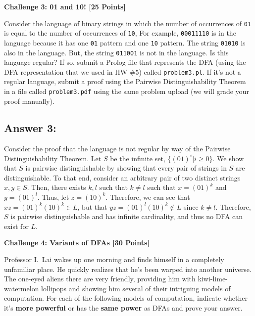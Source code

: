 \documentclass[12pt]{article}
\newcommand{\Problem}[3]{\mbox{} \newline \noindent \textbf{\textbf{Challenge #1: #2 [#3 Points] \\ }}}
\begin{document}
\Problem{3}{01 and 10!}{25}

Consider the language of binary strings in which the number of occurrences of \verb+01+ is equal to the number of occurrences of \verb+10+,  For example,
\verb+00011110+ is in the language because it has one \verb+01+ pattern and one \verb+10+ pattern.  The string \verb+01010+ is also in the language.  But, the string \verb+011001+ is not in the language.
Is this language regular?  If so, submit a Prolog file that represents the DFA (using the DFA representation that we used in HW \#5) called \verb+problem3.pl+.  If it's not a regular language, submit a proof using the Pairwise Distinguishability Theorem in a file called \verb+problem3.pdf+ using the same problem upload (we will grade your proof manually).
 
\subsection*{Answer 3:}
Consider the proof that the language is not regular by way of the Pairwise Distinguishability Theorem. Let $S$ be the infinite set, $\{(01)^i| i \geq 0\}$. We show that $S$ is pairwise distinguishable by showing that
every pair of strings in $S$ are distinguishable. To that end, consider an arbitrary pair
of two distinct strings $x, y \in S$. Then, there exists $k,l$ such that $k \neq l$ such that $x = (01)^k$ and $y = (01)^l$. Thus, let $z = (10)^k$. Therefore, we can see that $xz = (01)^k(10)^k \in L$, but that $yz = (01)^l(10)^k \not \in L$ since $k \neq l$. Therefore, $S$ is pairwise distinguishable and has infinite cardinality, and thus no DFA
can exist for $L$. 

\Problem{4}{Variants of DFAs}{30}

Professor I.~Lai wakes up one morning and finds himself in a completely unfamiliar place.  He quickly realizes that he's been warped into another universe.  The one-eyed aliens there are very friendly, providing him with kiwi-lime-watermelon lollipops and showing him several of their intriguing models of computation.  For each of the following models of computation, indicate whether it's \textbf{more powerful} or has the \textbf{same power} as DFAs and prove your answer.  
	
\end{document}
